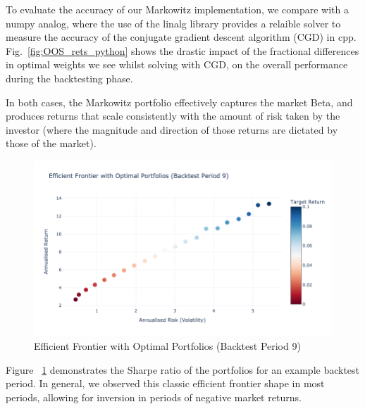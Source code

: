 \documentclass[12pt,twoside]{article}
\begin{document}
To evaluate the accuracy of our Markowitz implementation, we compare with a numpy analog, where the use of the linalg library provides a relaible solver to measure the accuracy of the conjugate gradient descent algorithm (CGD) in cpp. Fig.~\ref{fig:OOS_rets_python} shows the drastic impact of the fractional differences in optimal weights we see whilst solving with CGD, on the overall performance during the backtesting phase.
\linebreak

In both cases, the Markowitz portfolio effectively captures the market Beta, and produces returns that scale consistently with the amount of risk taken by the investor (where the magnitude and direction of those returns are dictated by those of the market). 
\linebreak

\begin{figure}[]
\centering %
\includegraphics[width = 1.0\hsize]{./figures/efficint_frontier.png} %
\caption{Efficient Frontier with Optimal Portfolios (Backtest Period 9)} 
\label{fig:efficint_frontier}
\end{figure}

Figure ~\ref{fig:efficint_frontier} demonstrates the Sharpe ratio of the portfolios for an example backtest period. In general, we observed this classic efficient frontier shape in most periods, allowing for inversion in periods of negative market returns. 
\linebreak
\end{document}

